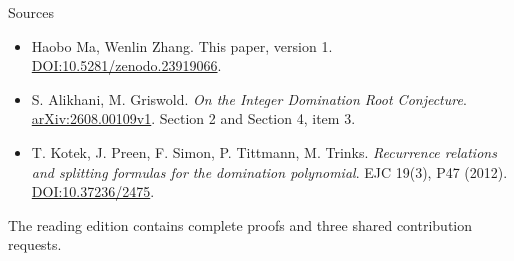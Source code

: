 \documentclass{beamer}
\begin{document}
\begin{frame}{Sources}
\small
\begin{itemize}
\item Haobo Ma, Wenlin Zhang. This paper, version 1. \href{https://doi.org/10.5281/zenodo.23919066}{DOI:10.5281/zenodo.23919066}.
\item S. Alikhani, M. Griswold. \emph{On the Integer Domination Root Conjecture}. \href{https://arxiv.org/abs/2608.00109v1}{arXiv:2608.00109v1}. Section 2 and Section 4, item 3.
\item T. Kotek, J. Preen, F. Simon, P. Tittmann, M. Trinks. \emph{Recurrence relations and splitting formulas for the domination polynomial}. EJC 19(3), P47 (2012). \href{https://doi.org/10.37236/2475}{DOI:10.37236/2475}.
\end{itemize}
\normalsize The reading edition contains complete proofs and three shared contribution requests.
\end{frame}
\appendix
\end{document}
